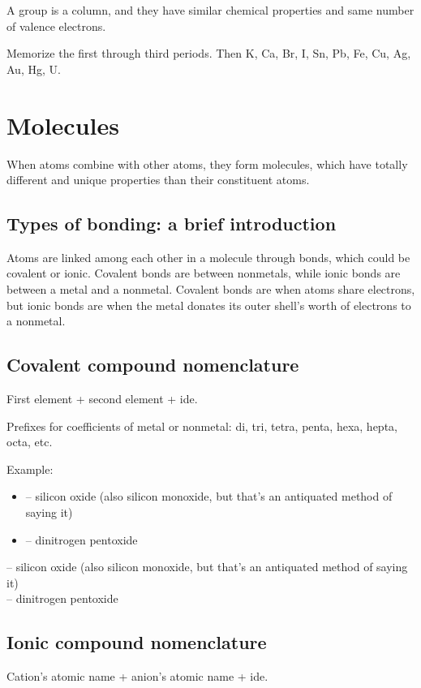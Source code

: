 \documentclass[letterpaper, 12pt]{article}
\begin{document}
A group is a column, and they have similar chemical properties and same number of valence electrons.

Memorize the first through third periods. Then K, Ca, Br, I, Sn, Pb, Fe, Cu, Ag, Au, Hg, U.

\section{Molecules}
When atoms combine with other atoms, they form molecules, which have totally different and unique properties than their constituent atoms.

	\subsection{Types of bonding: a brief introduction}
	Atoms are linked among each other in a molecule through bonds, which could be covalent or ionic. Covalent bonds are between nonmetals, while ionic bonds are between a metal and a nonmetal. Covalent bonds are when atoms share electrons, but ionic bonds are when the metal donates its outer shell's worth of electrons to a nonmetal.

	\subsection{Covalent compound nomenclature}
	First element + second element + ide.

	Prefixes for coefficients of metal or nonmetal: di, tri, tetra, penta, hexa, hepta, octa, etc.
	
	Example:
	
	\begin{itemize}
		\item {} -- silicon oxide (also silicon monoxide, but that's an antiquated method of saying it)
		\item {} -- dinitrogen pentoxide
	\end{itemize}

	 -- silicon oxide (also silicon monoxide, but that's an antiquated method of saying it)\\
	 -- dinitrogen pentoxide\\

	\subsection{Ionic compound nomenclature}
	Cation's atomic name + anion's atomic name + ide.
\end{document}
